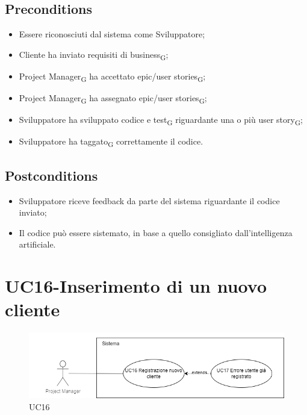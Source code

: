 \documentclass{article}
\begin{document}
    \subsection*{Preconditions}
        \begin{itemize}
            \item Essere riconosciuti dal sistema come Sviluppatore;
            \item Cliente ha inviato requisiti di business\textsubscript{G};
            \item Project Manager\textsubscript{G} ha accettato epic/user stories\textsubscript{G};
            \item Project Manager\textsubscript{G} ha assegnato epic/user stories\textsubscript{G};
            \item Sviluppatore ha sviluppato codice e test\textsubscript{G} riguardante una o più user story\textsubscript{G};
            \item Sviluppatore ha taggato\textsubscript{G} correttamente il codice.
        \end{itemize}
        
    \subsection*{Postconditions}
        \begin{itemize}
            \item Sviluppatore riceve feedback da parte del sistema riguardante il codice inviato;
            \item Il codice può essere sistemato, in base a quello consigliato dall'intelligenza artificiale.
        \end{itemize}
    

        
\section{UC16-Inserimento di un nuovo cliente}
    \begin{figure}[h]
      \centering
      \includegraphics{./imgUML/UC16.png}
    \caption{UC16}
      \label{fig:UC16}
    \end{figure}
    
\end{document}
